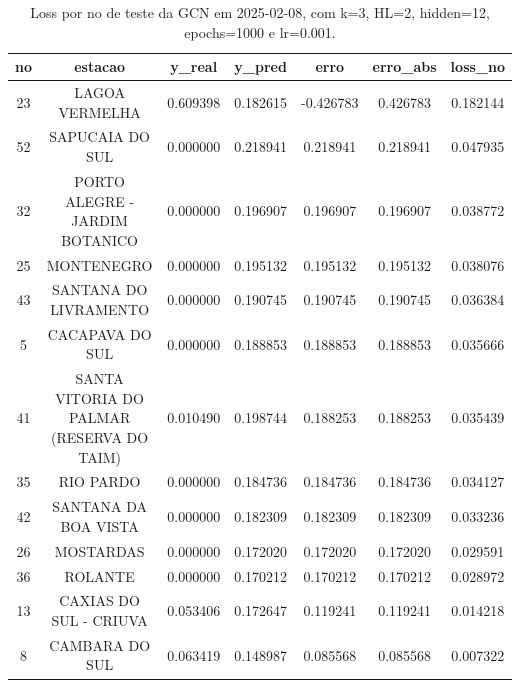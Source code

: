 \begin{table}[h]
\centering
\caption{Loss por no de teste da GCN em 2025-02-08, com k=3, HL=2, hidden=12, epochs=1000 e lr=0.001.}
\label{tab:gcn_loss_k3_hl2_h12_e1000_d20250208}
\begin{tabular}{ccccccc}
\toprule
no & estacao & y\_real & y\_pred & erro & erro\_abs & loss\_no \\
\midrule
23 & LAGOA VERMELHA & 0.609398 & 0.182615 & -0.426783 & 0.426783 & 0.182144 \\
52 & SAPUCAIA DO SUL & 0.000000 & 0.218941 & 0.218941 & 0.218941 & 0.047935 \\
32 & PORTO ALEGRE - JARDIM BOTANICO & 0.000000 & 0.196907 & 0.196907 & 0.196907 & 0.038772 \\
25 & MONTENEGRO & 0.000000 & 0.195132 & 0.195132 & 0.195132 & 0.038076 \\
43 & SANTANA DO LIVRAMENTO & 0.000000 & 0.190745 & 0.190745 & 0.190745 & 0.036384 \\
5 & CACAPAVA DO SUL & 0.000000 & 0.188853 & 0.188853 & 0.188853 & 0.035666 \\
41 & SANTA VITORIA DO PALMAR (RESERVA DO TAIM) & 0.010490 & 0.198744 & 0.188253 & 0.188253 & 0.035439 \\
35 & RIO PARDO & 0.000000 & 0.184736 & 0.184736 & 0.184736 & 0.034127 \\
42 & SANTANA DA BOA VISTA & 0.000000 & 0.182309 & 0.182309 & 0.182309 & 0.033236 \\
26 & MOSTARDAS & 0.000000 & 0.172020 & 0.172020 & 0.172020 & 0.029591 \\
36 & ROLANTE & 0.000000 & 0.170212 & 0.170212 & 0.170212 & 0.028972 \\
13 & CAXIAS DO SUL - CRIUVA & 0.053406 & 0.172647 & 0.119241 & 0.119241 & 0.014218 \\
8 & CAMBARA DO SUL & 0.063419 & 0.148987 & 0.085568 & 0.085568 & 0.007322 \\
\bottomrule
\end{tabular}
\end{table}
